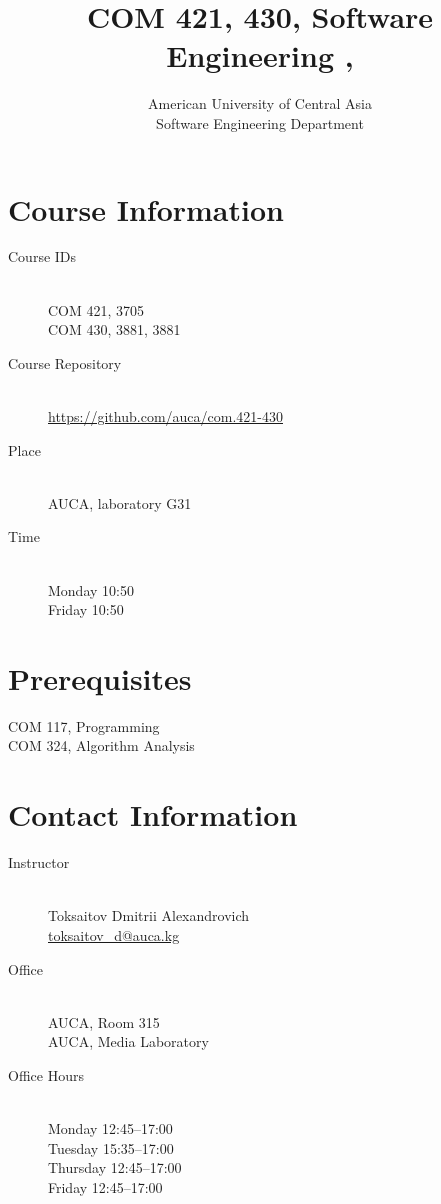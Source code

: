 \documentclass[12pt,a4paper,oneside]{article}
\newcommand{\R}[1]{\uppercase\expandafter{\romannumeral #1\relax}}
\begin{document}
    \title{COM 421, 430, Software Engineering \R{1}, \R{2}}
    \author{
        American University of Central Asia\\
        Software Engineering Department
    }
    \date{}
    \maketitle

    \section{Course Information}

        \begin{description}
            \item[Course IDs]\hfill\\
                COM 421, 3705\\
                COM 430, 3881, 3881
            \item[Course Repository]\hfill\\
                \url{https://github.com/auca/com.421-430}
            \item[Place]\hfill\\
                AUCA, laboratory G31
            \item[Time]\hfill\\
                Monday 10:50\\
                Friday 10:50
        \end{description}

    \section{Prerequisites}

        COM 117, Programming \R{2}\\
        COM 324, Algorithm Analysis

    \section{Contact Information}

        \begin{description}
            \item[Instructor]\hfill\\
                Toksaitov Dmitrii Alexandrovich\\
                \href{mailto:toksaitov_d@auca.kg}{toksaitov\_d@auca.kg}
            \item[Office]\hfill\\
                AUCA, Room 315\\
                AUCA, Media Laboratory
            \item[Office Hours]\hfill\\
                Monday 12:45--17:00\\
                Tuesday 15:35--17:00\\
                Thursday 12:45--17:00\\
                Friday 12:45--17:00
        \end{description}
\end{document}

